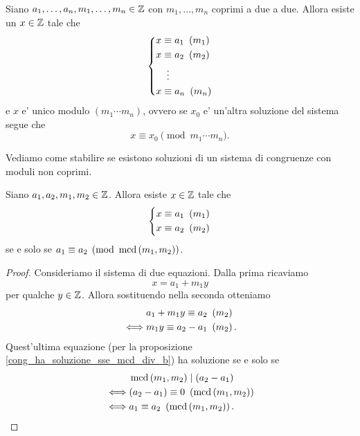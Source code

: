 \begin{corollary}
    \label{th_cinese_n}
    Siano $a_1, \dots, a_n, m_1, \dots, m_n \in \mathbb{Z}$ con $m_1, \dots, m_n$ coprimi a due a due. Allora esiste un $x \in \mathbb{Z}$ tale che
    \begin{equation*}
        \left\{
        \begin{alignedat}{1}
            x&\equiv a_1 \Mod{m_1}\\
            x&\equiv a_2 \Mod{m_2}\\
            &\vdotswithin{\equiv}\\
            x&\equiv a_n \Mod{m_n}
        \end{alignedat}      
        \right . 
    \end{equation*}
    e $x$ e' unico modulo $(m_1\cdots m_n)$, ovvero se $x_0$ e' un'altra soluzione del sistema segue che
    \begin{equation}
        x \equiv x_0 \pmod{m_1 \cdots m_n}.
    \end{equation} 
\end{corollary}

Vediamo come stabilire se esistono soluzioni di un sistema di congruenze con moduli non coprimi.

\begin{proposition}
    Siano $a_1, a_2, m_1, m_2 \in \mathbb{Z}$. Allora esiste $x \in \mathbb{Z}$ tale che 
    \begin{equation*}
        \left\{
        \begin{alignedat}{1}
            x&\equiv a_1 \ \left(m_1\right)\\
            x&\equiv a_2 \ \left(m_2\right)
        \end{alignedat}      
        \right . 
    \end{equation*}
    se e solo se $a_1 \equiv a_2 \pmod{\operatorname{mcd}\left(m_1, m_2\right)}$.
\end{proposition}
\begin{proof}
    Consideriamo il sistema di due equazioni. Dalla prima ricaviamo \[
        x = a_1 + m_1y    
    \] per qualche $y \in \mathbb{Z}$. Allora sostituendo nella seconda otteniamo \begin{alignat*}
        {1}
        &a_1+m_1y \equiv a_2 \ \left(m_2\right)\\
        \iff &m_1y \equiv a_2 - a_1 \ \left(m_2\right).
    \end{alignat*}
    Quest'ultima equazione (per la proposizione \ref{cong_ha_soluzione_sse_mcd_div_b}) ha soluzione se e solo se 
    \begin{alignat*}
        {1}
        &\operatorname{mcd}\left(m_1, m_2\right) \mid (a_2-a_1) \\
        \iff &(a_2-a_1) \equiv 0 \ \left(\operatorname{mcd}\left(m_1, m_2\right)\right) \\
        \iff &a_1 \equiv a_2 \ \left(\operatorname{mcd}\left(m_1, m_2\right)\right). \tag*{\qedhere}
    \end{alignat*}
\end{proof}

